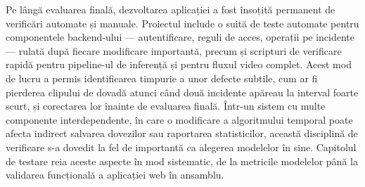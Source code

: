 Pe lângă evaluarea finală, dezvoltarea aplicației a fost însoțită permanent de verificări automate și manuale. Proiectul include o suită de teste automate pentru componentele backend-ului --- autentificare, reguli de acces, operații pe incidente --- rulată după fiecare modificare importantă, precum și scripturi de verificare rapidă pentru pipeline-ul de inferență și pentru fluxul video complet. Acest mod de lucru a permis identificarea timpurie a unor defecte subtile, cum ar fi pierderea clipului de dovadă atunci când două incidente apăreau la interval foarte scurt, și corectarea lor înainte de evaluarea finală. Într-un sistem cu multe componente interdependente, în care o modificare a algoritmului temporal poate afecta indirect salvarea dovezilor sau raportarea statisticilor, această disciplină de verificare s-a dovedit la fel de importantă ca alegerea modelelor în sine. Capitolul de testare reia aceste aspecte în mod sistematic, de la metricile modelelor până la validarea funcțională a aplicației web în ansamblu.
